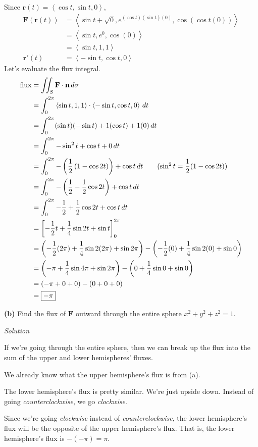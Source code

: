 \documentclass{article}
\newcommand{\lrp}[1]{\left( #1 \right)}
\newcommand{\lra}[1]{\left\langle #1 \right\rangle}
\newcommand{\lrb}[1]{\left[ #1 \right]}
\renewcommand{\r}[0]{\mathbf{r}}
\newcommand{\F}[0]{\mathbf{F}}
\newcommand{\n}[0]{\mathbf{n}}
\newcommand{\Solution}{\textit{Solution}}
\begin{document}
Since $\r(t)=\lra{\cos t,\sin t, 0}$,
\begin{align*}
    \F\lrp{\r(t)}&=\lra{\sin t +\sqrt{0},e^{(\cos t)(\sin t)(0)},\cos \lrp{\cos t(0)} }\\
    &=\lra{\sin t, e^0,\cos(0)}\\
    &=\lra{\sin t, 1, 1}\tag{$e^0=1$ and $\cos 0=1$}\\
    \r'(t)&=\lra{-\sin t, \cos t, 0}
\end{align*}
Let's evaluate the flux integral.
\begin{align*}
    \text{flux}&=\iint_S \F\cdot \n \,d\sigma \\
    &=\int_0^{2\pi}\lra{\sin  t,1,1}\cdot\lra{-\sin t,\cos t,0}\,dt\\
    &=\int_0^{2\pi}(\sin t)(-\sin t) + 1(\cos t) + 1(0)\,dt\\
    &=\int_0^{2\pi}-\sin^2 t + \cos t + 0\,dt\\
    &=\int_0^{2\pi} -\lrp{\frac{1}{2}\lrp{1 - \cos 2t}}+\cos t\,dt\tag{$\sin^2 t = \dfrac{1}{2}(1-\cos 2t)$}\\
    &=\int_0^{2\pi}-\lrp{\frac{1}{2}-\frac{1}{2}\cos 2t}+\cos t\,dt\\
    &=\int_0^{2\pi} -\frac{1}{2}+\frac{1}{2}\cos 2t + \cos t\,dt\\
    &=\lrb{-\frac{1}{2}t+\frac{1}{4}\sin 2t + \sin t}_0^{2\pi}\\
    &=\lrp{-\frac{1}{2}(2\pi)+\frac{1}{4}\sin 2(2\pi) + \sin 2\pi}-\lrp{-\frac{1}{2}(0)+\frac{1}{4}\sin 2(0)+\sin 0}\\
    &=\lrp{-\pi + \frac{1}{4}\sin 4\pi + \sin 2\pi}-\lrp{0+\frac{1}{4}\sin 0 + \sin 0}\\
    &=\lrp{-\pi + 0 + 0}-\lrp{0+0+0}\\
    &=\boxed{-\pi}
\end{align*}
{}\textbf{(b)} Find the flux of $\F$ outward through the entire sphere $x^2+y^2+z^2=1$.

\Solution

If we're going through the entire sphere, then we can break up the flux into the sum of the upper and lower hemispheres' fluxes.

We already know what the upper hemisphere's flux is from (a).

The lower hemisphere's flux is pretty similar. We're just upside down.  Instead of going \textit{counterclockwise}, we go \textit{clockwise}.

Since we're going \textit{clockwise} instead of \textit{counterclockwise}, the lower hemisphere's flux will be the opposite of the upper hemisphere's flux. That is, the lower hemisphere's flux is $-(-\pi)=\pi$.
\end{document}
